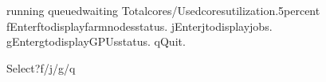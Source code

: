\documentclass[a4paper,11pt,english]{sphinxmanual}
\begin{document}
\begin{sphinxVerbatim}[commandchars=\\\{\}]
running
queuedwaiting
Totalcores/Usedcoresutilization.5percent
\PYGZhy{}\PYGZhy{}\PYGZhy{}\PYGZhy{}\PYGZhy{}\PYGZhy{}\PYGZhy{}\PYGZhy{}\PYGZhy{}\PYGZhy{}\PYGZhy{}\PYGZhy{}\PYGZhy{}\PYGZhy{}\PYGZhy{}\PYGZhy{}\PYGZhy{}\PYGZhy{}\PYGZhy{}\PYGZhy{}\PYGZhy{}\PYGZhy{}\PYGZhy{}\PYGZhy{}\PYGZhy{}\PYGZhy{}\PYGZhy{}\PYGZhy{}\PYGZhy{}\PYGZhy{}\PYGZhy{}\PYGZhy{}\PYGZhy{}\PYGZhy{}\PYGZhy{}\PYGZhy{}\PYGZhy{}\PYGZhy{}\PYGZhy{}\PYGZhy{}\PYGZhy{}\PYGZhy{}\PYGZhy{}\PYGZhy{}\PYGZhy{}\PYGZhy{}\PYGZhy{}\PYGZhy{}\PYGZhy{}\PYGZhy{}\PYGZhy{}\PYGZhy{}\PYGZhy{}\PYGZhy{}\PYGZhy{}\PYGZhy{}\PYGZhy{}\PYGZhy{}\PYGZhy{}\PYGZhy{}\PYGZhy{}\PYGZhy{}\PYGZhy{}\PYGZhy{}\PYGZhy{}\PYGZhy{}\PYGZhy{}\PYGZhy{}\PYGZhy{}\PYGZhy{}\PYGZhy{}\PYGZhy{}\PYGZhy{}\PYGZhy{}\PYGZhy{}\PYGZhy{}\PYGZhy{}\PYGZhy{}\PYGZhy{}\PYGZhy{}\PYGZhy{}\PYGZhy{}\PYGZhy{}\PYGZhy{}\PYGZhy{}\PYGZhy{}\PYGZhy{}\PYGZhy{}\PYGZhy{}\PYGZhy{}\PYGZhy{}\PYGZhy{}\PYGZhy{}\PYGZhy{}\PYGZhy{}\PYGZhy{}\PYGZhy{}\PYGZhy{}\PYGZhy{}\PYGZhy{}\PYGZhy{}\PYGZhy{}\PYGZhy{}\PYGZhy{}\PYGZhy{}\PYGZhy{}\PYGZhy{}\PYGZhy{}\PYGZhy{}\PYGZhy{}\PYGZhy{}\PYGZhy{}\PYGZhy{}\PYGZhy{}\PYGZhy{}\PYGZhy{}\PYGZhy{}\PYGZhy{}\PYGZhy{}\PYGZhy{}
fEnterftodisplayfarmnodesstatus.
jEnterjtodisplayjobs.
gEntergtodisplayGPUsstatus.
qQuit.

Select?f/j/g/q\PYGZus{}\PYGZus{}


\end{sphinxVerbatim}
\end{document}
